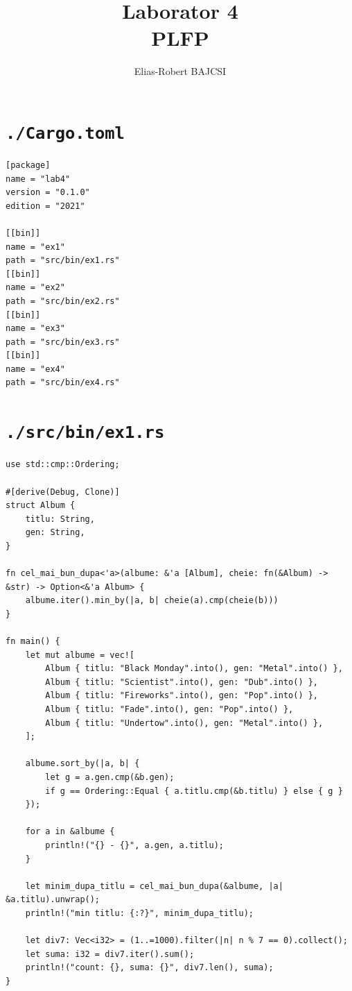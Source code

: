 \documentclass[11pt]{article}
\author{Elias-Robert BAJCSI}
\date{}
\title{Laborator 4\\\medskip
\large PLFP}
\begin{document}
\maketitle
\section{\texttt{./Cargo.toml}}
\label{sec:org6fb5f2d}
\begin{verbatim}
[package]
name = "lab4"
version = "0.1.0"
edition = "2021"

[[bin]]
name = "ex1"
path = "src/bin/ex1.rs"
[[bin]]
name = "ex2"
path = "src/bin/ex2.rs"
[[bin]]
name = "ex3"
path = "src/bin/ex3.rs"
[[bin]]
name = "ex4"
path = "src/bin/ex4.rs"
\end{verbatim}
\section{\texttt{./src/bin/ex1.rs}}
\label{sec:org20c6d9f}
\begin{verbatim}
use std::cmp::Ordering;

#[derive(Debug, Clone)]
struct Album {
    titlu: String,
    gen: String,
}

fn cel_mai_bun_dupa<'a>(albume: &'a [Album], cheie: fn(&Album) -> &str) -> Option<&'a Album> {
    albume.iter().min_by(|a, b| cheie(a).cmp(cheie(b)))
}

fn main() {
    let mut albume = vec![
        Album { titlu: "Black Monday".into(), gen: "Metal".into() },
        Album { titlu: "Scientist".into(), gen: "Dub".into() },
        Album { titlu: "Fireworks".into(), gen: "Pop".into() },
        Album { titlu: "Fade".into(), gen: "Pop".into() },
        Album { titlu: "Undertow".into(), gen: "Metal".into() },
    ];

    albume.sort_by(|a, b| {
        let g = a.gen.cmp(&b.gen);
        if g == Ordering::Equal { a.titlu.cmp(&b.titlu) } else { g }
    });

    for a in &albume {
        println!("{} - {}", a.gen, a.titlu);
    }

    let minim_dupa_titlu = cel_mai_bun_dupa(&albume, |a| &a.titlu).unwrap();
    println!("min titlu: {:?}", minim_dupa_titlu);

    let div7: Vec<i32> = (1..=1000).filter(|n| n % 7 == 0).collect();
    let suma: i32 = div7.iter().sum();
    println!("count: {}, suma: {}", div7.len(), suma);
}
\end{verbatim}
\end{document}
